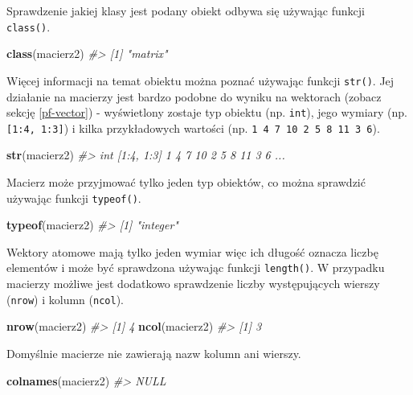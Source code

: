 \documentclass[paper=6in:9in,pagesize=pdftex,headinclude=on,footinclude=on,10pt]{scrbook}
\newenvironment{Shaded}{\begin{snugshade}}{\end{snugshade}}
\newcommand{\CommentTok}[1]{\textcolor[rgb]{0.56,0.35,0.01}{\textit{#1}}}
\newcommand{\KeywordTok}[1]{\textcolor[rgb]{0.13,0.29,0.53}{\textbf{#1}}}
\newcommand{\NormalTok}[1]{#1}
\begin{document}
Sprawdzenie jakiej klasy jest podany obiekt odbywa się używając funkcji \texttt{class()}.

\begin{Shaded}
\begin{Highlighting}[]
\KeywordTok{class}\NormalTok{(macierz2)}
\CommentTok{#> [1] "matrix"}
\end{Highlighting}
\end{Shaded}

Więcej informacji na temat obiektu można poznać używając funkcji \texttt{str()}.
Jej działanie na macierzy jest bardzo podobne do wyniku na wektorach (zobacz sekcję \ref{pf-vector}) - wyświetlony zostaje typ obiektu (np. \texttt{int}), jego wymiary (np. \texttt{{[}1:4,\ 1:3{]}}) i kilka przykładowych wartości (np. \texttt{1\ 4\ 7\ 10\ 2\ 5\ 8\ 11\ 3\ 6}).

\begin{Shaded}
\begin{Highlighting}[]
\KeywordTok{str}\NormalTok{(macierz2)}
\CommentTok{#>  int [1:4, 1:3] 1 4 7 10 2 5 8 11 3 6 ...}
\end{Highlighting}
\end{Shaded}

Macierz może przyjmować tylko jeden typ obiektów, co można sprawdzić używając funkcji \texttt{typeof()}.

\begin{Shaded}
\begin{Highlighting}[]
\KeywordTok{typeof}\NormalTok{(macierz2)}
\CommentTok{#> [1] "integer"}
\end{Highlighting}
\end{Shaded}

Wektory atomowe mają tylko jeden wymiar więc ich długość oznacza liczbę elementów i może być sprawdzona używając funkcji \texttt{length()}.
W przypadku macierzy możliwe jest dodatkowo sprawdzenie liczby występujących wierszy (\texttt{nrow}) i kolumn (\texttt{ncol}).

\begin{Shaded}
\begin{Highlighting}[]
\KeywordTok{nrow}\NormalTok{(macierz2)}
\CommentTok{#> [1] 4}
\KeywordTok{ncol}\NormalTok{(macierz2)}
\CommentTok{#> [1] 3}
\end{Highlighting}
\end{Shaded}

Domyślnie macierze nie zawierają nazw kolumn ani wierszy.

\begin{Shaded}
\begin{Highlighting}[]
\KeywordTok{colnames}\NormalTok{(macierz2)}
\CommentTok{#> NULL}
\end{Highlighting}
\end{Shaded}
\end{document}
